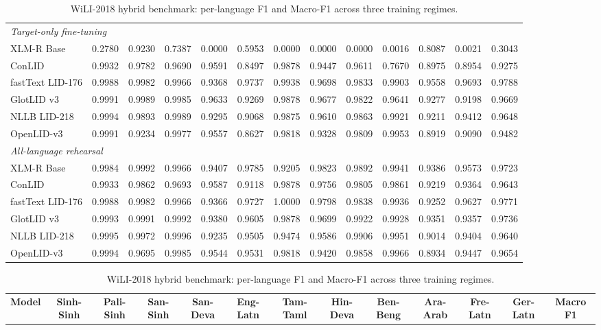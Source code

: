 \documentclass[11pt]{article}
\begin{document}
\begin{table}[p]
\begin{tabular}{l ccc cccccccc c}
\midrule
\multicolumn{13}{l}{\textit{Target-only fine-tuning}} \\
XLM-R Base & 0.2780 & 0.9230 & 0.7387 & 0.0000 & 0.5953 & 0.0000 & 0.0000 & 0.0000 & 0.0016 & 0.8087 & 0.0021 & 0.3043 \\
ConLID & 0.9932 & 0.9782 & 0.9690 & 0.9591 & 0.8497 & 0.9878 & 0.9447 & 0.9611 & 0.7670 & 0.8975 & 0.8954 & 0.9275 \\
fastText LID-176 & 0.9988 & 0.9982 & 0.9966 & 0.9368 & 0.9737 & 0.9938 & 0.9698 & 0.9833 & 0.9903 & 0.9558 & 0.9693 & 0.9788 \\
GlotLID v3 & 0.9991 & 0.9989 & 0.9985 & 0.9633 & 0.9269 & 0.9878 & 0.9677 & 0.9822 & 0.9641 & 0.9277 & 0.9198 & 0.9669 \\
NLLB LID-218 & 0.9994 & 0.9893 & 0.9989 & 0.9295 & 0.9068 & 0.9875 & 0.9610 & 0.9863 & 0.9921 & 0.9211 & 0.9412 & 0.9648 \\
OpenLID-v3 & 0.9991 & 0.9234 & 0.9977 & 0.9557 & 0.8627 & 0.9818 & 0.9328 & 0.9809 & 0.9953 & 0.8919 & 0.9090 & 0.9482 \\
\midrule
\multicolumn{13}{l}{\textit{All-language rehearsal}} \\
XLM-R Base & 0.9984 & 0.9992 & 0.9966 & 0.9407 & 0.9785 & 0.9205 & 0.9823 & 0.9892 & 0.9941 & 0.9386 & 0.9573 & 0.9723 \\
ConLID & 0.9933 & 0.9862 & 0.9693 & 0.9587 & 0.9118 & 0.9878 & 0.9756 & 0.9805 & 0.9861 & 0.9219 & 0.9364 & 0.9643 \\
fastText LID-176 & 0.9988 & 0.9982 & 0.9966 & 0.9366 & 0.9727 & 1.0000 & 0.9798 & 0.9838 & 0.9936 & 0.9252 & 0.9627 & 0.9771 \\
GlotLID v3 & 0.9993 & 0.9991 & 0.9992 & 0.9380 & 0.9605 & 0.9878 & 0.9699 & 0.9922 & 0.9928 & 0.9351 & 0.9357 & 0.9736 \\
NLLB LID-218 & 0.9995 & 0.9972 & 0.9996 & 0.9235 & 0.9505 & 0.9474 & 0.9586 & 0.9906 & 0.9951 & 0.9014 & 0.9404 & 0.9640 \\
OpenLID-v3 & 0.9994 & 0.9695 & 0.9985 & 0.9544 & 0.9531 & 0.9818 & 0.9420 & 0.9858 & 0.9966 & 0.8934 & 0.9447 & 0.9654 \\
\bottomrule
\end{tabular}
\vspace{4pt}
\caption{WiLI-2018 hybrid benchmark: per-language F1 and Macro-F1 across three training regimes.}
\label{tab:wili_full}
\begin{tabular}{l ccc cccccccc c}
\toprule
\textbf{Model} & \textbf{Sinh-Sinh} & \textbf{Pali-Sinh} & \textbf{San-Sinh} & \textbf{San-Deva} & \textbf{Eng-Latn} & \textbf{Tam-Taml} & \textbf{Hin-Deva} & \textbf{Ben-Beng} & \textbf{Ara-Arab} & \textbf{Fre-Latn} & \textbf{Ger-Latn} & \textbf{Macro F1} \\

\end{tabular}
\end{table}
\end{document}
